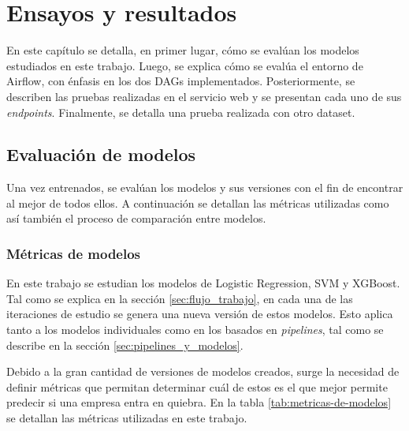 \chapter{Ensayos y resultados} %

\label{Chapter4}

En este capítulo se detalla, en primer lugar, cómo se evalúan los modelos estudiados en este trabajo. Luego, se explica cómo se evalúa el entorno de Airflow, con énfasis en los dos DAGs implementados. Posteriormente, se describen las pruebas realizadas en el servicio web y se presentan cada uno de sus \textit{endpoints}. Finalmente, se detalla una prueba realizada con otro dataset.


\section{Evaluación de modelos}
\label{sec:pruebas_indiv_modelos}

Una vez entrenados, se evalúan los modelos y sus versiones con el fin de encontrar al mejor de todos ellos. A continuación se detallan las métricas utilizadas como así también el proceso de comparación entre modelos.

\subsection{Métricas de modelos}
En este trabajo se estudian los modelos de Logistic Regression, SVM y XGBoost. Tal como se explica en la sección \ref{sec:flujo_trabajo}, en cada una de las iteraciones de estudio se genera una nueva versión de estos modelos. Esto aplica tanto a los modelos individuales como en los basados en \textit{pipelines}, tal como se describe en la sección \ref{sec:pipelines_y_modelos}.

Debido a la gran cantidad de versiones de modelos creados, surge la necesidad de definir métricas que permitan determinar cuál de estos es el que mejor permite predecir si una empresa entra en quiebra. En la tabla \ref{tab:metricas-de-modelos} se detallan las métricas utilizadas en este trabajo.

